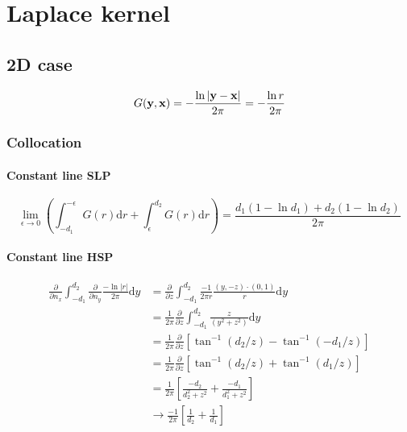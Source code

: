 \documentclass[a4paper,11pt]{article}
\newcommand{\td}{\mathrm{d}}
\begin{document}
\setcounter{tocdepth}{5}
\tableofcontents

\section{Laplace kernel}

\subsection{2D case}

\begin{equation}
G({\bf y}, {\bf x}) = -\frac{\ln |{\bf y}-{\bf x}|}{2\pi} = -\frac{\ln r}{2\pi}
\end{equation}

\subsubsection{Collocation}

\paragraph{Constant line SLP}

\begin{equation}
\lim_{\epsilon \to 0} \left( \int_{-d_1}^{-\epsilon} G(r) \td r + \int_{\epsilon}^{d_2} G(r) \td r \right)
=
\frac{d_1(1-\ln d_1) + d_2(1-\ln d_2)}{2\pi}
\end{equation}

\paragraph{Constant line HSP}

\begin{align}
\frac{\partial}{\partial n_x}
\int_{-d_1}^{d_2} 
\frac{\partial}{\partial n_y}
\frac{-\ln |r|}{2\pi}
\td y 
&=
\frac{\partial}{\partial z}
\int_{-d_1}^{d_2} 
\frac{-1}{2\pi r} \frac{(y, -z) \cdot (0,1)}{r}
\td y \nonumber \\
&=
\frac{1}{2\pi} \frac{\partial}{\partial z}
\int_{-d_1}^{d_2} 
\frac{z}{\left(y^2+z^2\right)}
\td y \nonumber \\
&=
\frac{1}{2\pi} \frac{\partial}{\partial z}
\left[
\tan^{-1}\left(d_2/z\right)
-
\tan^{-1}\left(-d_1/z\right)
\right]
\nonumber \\
&=
\frac{1}{2\pi} \frac{\partial}{\partial z}
\left[
\tan^{-1}\left(d_2/z\right) + \tan^{-1}\left(d_1/z\right)
\right]
\nonumber \\
&=
\frac{1}{2\pi} 
\left[
\frac{-d_2}{d_2^2+z^2} + \frac{-d_1}{d_1^2+z^2}
\right]
\nonumber \\
& \to
\frac{-1}{2\pi} 
\left[
\frac{1}{d_2} + \frac{1}{d_1}
\right]
\end{align}
\end{document}
